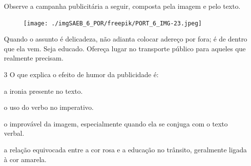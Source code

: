 

Observe a campanha publicitária a seguir, composta pela imagem e
pelo texto.

\begin{myquote}
\begin{figure}[H]
\centering\texttt{[image: ./imgSAEB\_6\_POR/freepik/PORT\_6\_IMG-23.jpeg]}
\end{figure}

Quando o assunto é delicadeza, não adianta colocar adereço por fora; é
de dentro que ela vem. Seja educado. Ofereça lugar no transporte público
para aqueles que realmente precisam. 
\end{myquote}

\num{3} O que explica o efeito de humor da publicidade é:

\begin{escolha}
\item a ironia presente no texto.
\item o uso do verbo no imperativo.
\item o improvável da imagem, especialmente quando ela se conjuga com o
texto verbal. \item a relação equivocada entre a cor rosa e a educação no trânsito,
geralmente ligada à cor amarela.
\end{escolha}

